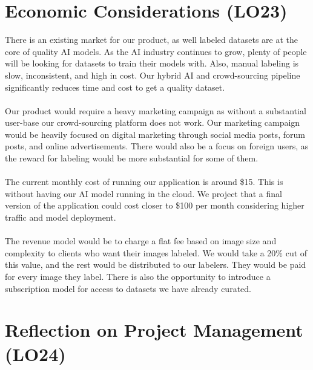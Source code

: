 \documentclass{article}
\begin{document}
\section{Economic Considerations (LO23)}
There is an existing market for our product, as well labeled datasets are at the core of quality AI models. As the AI industry continues to grow, plenty of people will be looking for datasets to train their models with. Also, manual labeling is slow, inconsistent, and high in cost. Our hybrid AI and crowd-sourcing pipeline significantly reduces time and cost to get a quality dataset.
\\\\
Our product would require a heavy marketing campaign as without a substantial user-base our crowd-sourcing platform does not work. Our marketing campaign would be heavily focused on digital marketing through social media posts, forum posts, and online advertisements. There would also be a focus on foreign users, as the reward for labeling would be more substantial for some of them.
\\\\
The current monthly cost of running our application is around \$15. This is without having our AI model running in the cloud. We project that a final version of the application could cost closer to \$100 per month considering higher traffic and model deployment.
\\\\
The revenue model would be to charge a flat fee based on image size and complexity to clients who want their images labeled. We would take a 20\% cut of this value, and the rest would be distributed to our labelers. They would be paid for every image they label. There is also the opportunity to introduce a subscription model for access to datasets we have already curated.

\section{Reflection on Project Management (LO24)}
\end{document}
